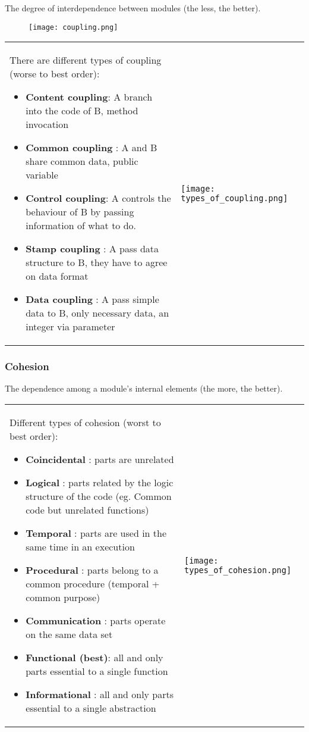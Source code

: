 The degree of interdependence between modules (the less, the better).

\begin{figure}[!ht]
    \centering
    \texttt{[image: coupling.png]}
\end{figure}


\begin{tabular}{m{11cm}m{7cm}}
There are different types of coupling (worse to best order):
\begin{itemize}
    \item \textbf{Content coupling}: A branch into the code of B, method invocation
    \item \textbf{Common coupling }: A and B share common data, public variable
    \item \textbf{Control coupling}: A controls the behaviour of B by passing information of what to do.
    \item \textbf{Stamp coupling  }: A pass data structure to B, they have to agree on data format
    \item \textbf{Data coupling   }: A pass simple data to B, only necessary data, an integer via parameter
\end{itemize}
&
    \texttt{[image: types\_of\_coupling.png]}
\end{tabular}


\subsubsection{Cohesion}

The dependence among a module's internal elements (the more, the better). 

\begin{tabular}{m{11cm}m{7cm}}
Different types of cohesion (worst to best order):
\begin{itemize}
\item \textbf{Coincidental     }: parts are unrelated
\item \textbf{Logical          }: parts related by the logic structure of the code (eg. Common code but unrelated functions)
\item \textbf{Temporal         }: parts are used in the same time in an execution
\item \textbf{Procedural       }: parts belong to a common procedure (temporal + common purpose)
\item \textbf{Communication    }: parts operate on the same data set
\item \textbf{Functional (best)}: all and only parts essential to a single function
\item \textbf{Informational    }: all and only parts essential to a single abstraction
\end{itemize}
&
    \texttt{[image: types\_of\_cohesion.png]}
\end{tabular}


